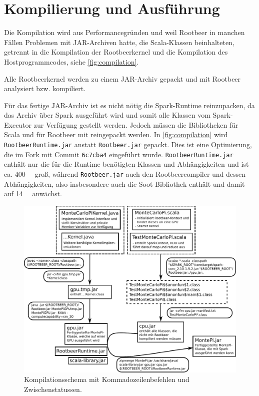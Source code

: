 \section{Kompilierung und Ausführung}
\label{sct:compilation}

Die Kompilation wird aus Performancegründen und weil Rootbeer in manchen Fällen Problemen mit JAR-Archiven hatte, die Scala-Klassen beinhalteten, getrennt in die Kompilation der Rootbeerkernel und die Kompilation des Hostprogrammcodes, siehe \autoref{fig:compilation}.

Alle Rootbeerkernel werden zu einem JAR-Archiv gepackt und mit Rootbeer analysiert bzw. kompiliert.

Für das fertige JAR-Archiv ist es nicht nötig die Spark-Runtime reinzupacken, da das Archiv über Spark ausgeführt wird und somit alle Klassen vom Spark-Executor zur Verfügung gestellt werden.
Jedoch müssen die Bibliotheken für Scala und für Rootbeer mit reingepackt werden.
In \autoref{fig:compilation} wird \lstinline!RootbeerRuntime.jar! anstatt \lstinline!Rootbeer.jar! gepackt.
Dies ist eine Optimierung, die im Fork \cite{ownrootbeerfork} mit Commit \lstinline!6c7cba4! eingeführt wurde.
\lstinline!RootbeerRuntime.jar! enthält nur die für die Runtime benötigten Klassen und Abhängigkeiten und ist ca. \SI{400}{\kilo\byte} groß, während \lstinline!Rootbeer.jar! auch den Rootbeercompiler und dessen Abhängigkeiten, also insbesondere auch die Soot-Bibliothek enthält und damit auf \SI{14}{\mega\byte} anwächst.\\

\begin{figure}[H]
    \centering
    \begin{minipage}{\linewidth}
        \includegraphics[width=\linewidth]{compile-structure-deu-new.pdf}
    \end{minipage}
    \caption{Kompilationsschema mit Kommadozeilenbefehlen und Zwischenstatussen.}
    \label{fig:compilation}
\end{figure}

